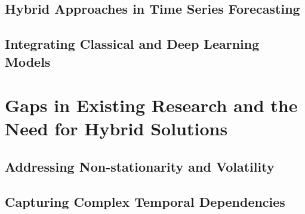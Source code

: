 \subsection{Hybrid Approaches in Time Series Forecasting}
\subsection{Integrating Classical and Deep Learning Models}






\section{Gaps in Existing Research and the Need for Hybrid Solutions} 
\subsection{Addressing Non-stationarity and Volatility}
\subsection{Capturing Complex Temporal Dependencies} 



